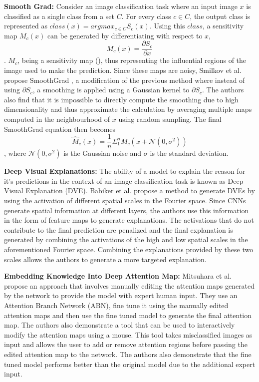 \textbf{Smooth Grad: }
Consider an image classification task where an input image $x$ is classified as a single class from a set $C$. For every class $c \in C$, the output class is represented as $class(x) = argmax_{c \in C}S_{c}(x)$. Using this $class$, a sensitivity map $M_{c}(x)$ can be generated by differentiating with respect to $x$, $$M_{c}(x) = \frac{\partial S_{c}}{\partial x}$$ . $M_{c}$, being a sensitivity map (\cite{simonyanDeepConvolutionalNetworks2014}), thus representing the influential regions of the image used to make the prediction. Since these maps are noisy, Smilkov et al. propose SmoothGrad \cite{smilkovSmoothGradRemovingNoise2017}, a modification of the previous method where instead of using $\partial S_{c}$, a smoothing is applied using a Gaussian kernel to $\partial S_{c}$. The authors also find that it is impossible to directly compute the smoothing due to high dimensionality and thus approximate the calculation by averaging multiple maps computed in the neighbourhood of $x$ using random sampling. The final SmoothGrad equation then becomes $$\hat M_{c}(x) = \frac{1}{n}\Sigma_{1}^{n}M_{c}(x + \mathcal{N}(0, \sigma^{2}))$$, where $\mathcal{N}(0, \sigma^{2})$ is the Gaussian noise and $\sigma$ is the standard deviation.

\textbf{Deep Visual Explanations: }
The ability of a model to explain the reason for it's predictions in the context of an image classification task is known as Deep Visual Explanation (DVE). Babiker et al. \cite{babikerIntroductionDeepVisual2018} propose a method to generate DVEs by using the activation of different spatial scales in the Fourier space. Since CNNs generate spatial information at different layers, the authors use this information in the form of feature maps to generate explanations. The activations that do not contribute to the final prediction are penalized and the final explanation is generated by combining the activations of the high and low spatial scales in the aforementioned Fourier space. Combining the explanations provided by these two scales allows the authors to generate a more targeted explanation.

\textbf{Embedding Knowledge Into Deep Attention Map: }
Mitsuhara et al. \cite{mitsuharaEmbeddingHumanKnowledge2019} propose an approach that involves manually editing the attention maps generated by the network to provide the model with expert human input. They use an Attention Branch Network (ABN), fine tune it using the manually edited attention maps and then use the fine tuned model to generate the final attention map. The authors also demonstrate a tool that can be used to interactively modify the attention maps using a mouse. This tool takes misclassified images as input and allows the user to add or remove attention regions before passing the edited attention map to the network. The authors also demonstrate that the fine tuned model performs better than the original model due to the additional expert input.

